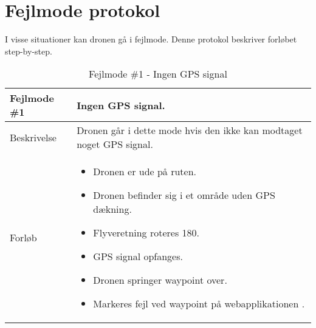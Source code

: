 \chapter{Fejlmode protokol}

I visse situationer kan dronen gå i fejlmode. Denne protokol beskriver forløbet step-by-step.

\begin{table}[H]
\begin{tabular}{| p{3cm}| p{11.5cm}|}
\hline

Fejlmode \#1	 							& Ingen GPS signal. \\\hline
Beskrivelse 									& Dronen går i dette mode hvis den ikke kan modtaget noget GPS signal. \\\hline
Forløb											& \begin{itemize}
															\item Dronen er ude på ruten.
															\item Dronen befinder sig i et område uden GPS dækning.
															\item Flyveretning roteres 180\degree.
															\item GPS signal opfanges.
															\item Dronen springer waypoint over.
															\item Markeres fejl ved waypoint på webapplikationen .
														\end{itemize} \\\hline 
\end{tabular}
\caption{Fejlmode \#1 - Ingen GPS signal}
\label{tab:fejlmode1}
\end{table}
